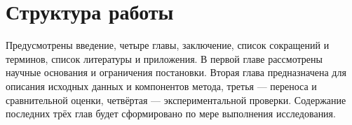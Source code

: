 \section*{Структура работы}
Предусмотрены введение, четыре главы, заключение, список сокращений и терминов, список литературы и приложения. В первой главе рассмотрены научные основания и ограничения постановки. Вторая глава предназначена для описания исходных данных и компонентов метода, третья --- переноса и сравнительной оценки, четвёртая --- экспериментальной проверки. Содержание последних трёх глав будет сформировано по мере выполнения исследования.
